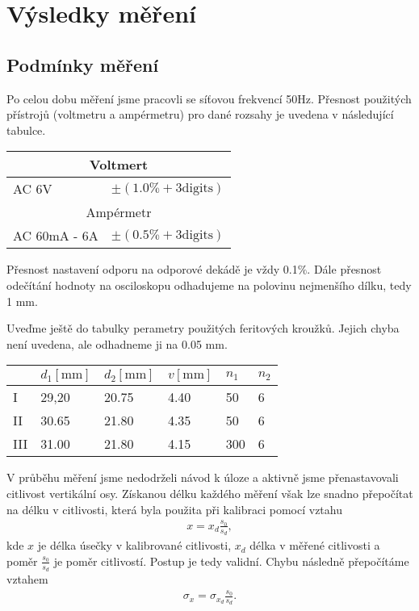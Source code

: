 \documentclass{article}
\begin{document}
\section{Výsledky měření}
\subsection{Podmínky měření}
\par Po celou dobu měření jsme pracovli se síťovou frekvencí 50Hz. Přesnost použitých přístrojů (voltmetru a ampérmetru) pro dané rozsahy je uvedena v následující tabulce. 
\begin{center}
    \label{tab:title} 
    \begin{tabular}[h!]{| l | l |}
    \hline
     \multicolumn{2}{|c|}{Voltmert} \\
     \hline
    AC 6$\mathrm{V}$  & $\pm(1.0\mathrm{\%} + 3\mathrm{digits})$  \\ \hline
    \multicolumn{2}{|c|}{Ampérmetr} \\
    \hline
    AC 60$\mathrm{mA}$ - 6$\mathrm{A}$ & $\pm(0.5\mathrm{\%} + 3\mathrm{digits})$ \\ \hline
    \end{tabular}
\end{center}

Přesnost nastavení odporu na odporové dekádě je vždy 0.1$\mathrm{\%}$. Dále přesnost odečítání hodnoty na osciloskopu odhadujeme na polovinu nejmenšího dílku, tedy 1 mm.
\par Uveďme ještě do tabulky perametry použitých feritových kroužků. Jejich chyba není uvedena, ale odhadneme ji na 0.05 mm.
\begin{center}
    \label{tab:title} 
    \begin{tabular}[h!]{| l | l | l | l | l | l |}
    \hline
     & $d_1 [\mathrm{mm}]$ & $d_2 [\mathrm{mm}]$ & $v [\mathrm{mm}]$ & $n_1$ & $n_2$ \\ \hline \hline
    I   & 29,20 & 20.75 & 4.40 & 50  & 6  \\ \hline
    II  & 30.65 & 21.80 & 4.35 & 50  & 6  \\ \hline
    III & 31.00 & 21.80 & 4.15 & 300 & 6  \\ \hline
    \end{tabular}
\end{center}
\par V průběhu měření jsme nedodrželi návod k úloze a aktivně jsme přenastavovali citlivost vertikální osy. Získanou délku každého měření však lze snadno přepočítat na délku v citlivosti, která byla použita při kalibraci pomocí vztahu
\begin{align}
    x = x_d \frac{s_0}{s_d},
\end{align}
kde $x$ je délka úsečky v kalibrované citlivosti, $x_d$ délka v měřené citlivosti a poměr $\frac{s_0}{s_d}$ je poměr citlivostí. Postup je tedy validní. Chybu následně přepočítáme vztahem
\begin{align}
    \sigma_x = \sigma_{x_d} \frac{s_0}{s_d}.
\end{align}
\end{document}
